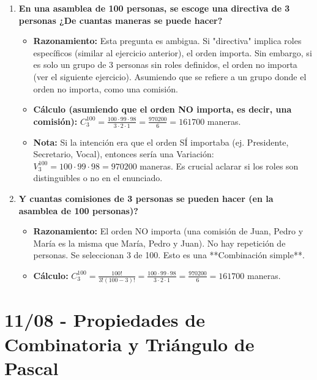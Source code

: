 \documentclass[12pt, letterpaper]{article}
\begin{document}
\begin{enumerate}[leftmargin=*,label=\arabic*.]
	\item \textbf{En una asamblea de 100 personas, se escoge una directiva de 3 personas ¿De cuantas maneras se puede hacer?}
	      \begin{itemize}
		      \item \textbf{Razonamiento:} Esta pregunta es ambigua. Si "directiva" implica roles específicos (similar al ejercicio anterior), el orden importa. Sin embargo, si es solo un grupo de 3 personas sin roles definidos, el orden no importa (ver el siguiente ejercicio). Asumiendo que se refiere a un grupo donde el orden no importa, como una comisión.
		      \item \textbf{Cálculo (asumiendo que el orden NO importa, es decir, una comisión):} $C_3^{100} = \frac{100 \cdot 99 \cdot 98}{3 \cdot 2 \cdot 1} = \frac{970200}{6} = 161700$ maneras.
		      \item \textbf{Nota:} Si la intención era que el orden SÍ importaba (ej. Presidente, Secretario, Vocal), entonces sería una Variación: $V_3^{100} = 100 \cdot 99 \cdot 98 = 970200$ maneras. Es crucial aclarar si los roles son distinguibles o no en el enunciado.
	      \end{itemize}

	\item \textbf{Y cuantas comisiones de 3 personas se pueden hacer (en la asamblea de 100 personas)?}
	      \begin{itemize}
		      \item \textbf{Razonamiento:} El orden NO importa (una comisión de Juan, Pedro y María es la misma que María, Pedro y Juan). No hay repetición de personas. Se seleccionan 3 de 100. Esto es una **Combinación simple**.
		      \item \textbf{Cálculo:} $C_3^{100} = \frac{100!}{3!(100-3)!} = \frac{100 \cdot 99 \cdot 98}{3 \cdot 2 \cdot 1} = \frac{970200}{6} = 161700$ maneras.
	      \end{itemize}
\end{enumerate}

\newpage

\section{11/08 - Propiedades de Combinatoria y Triángulo de Pascal}
\end{document}
